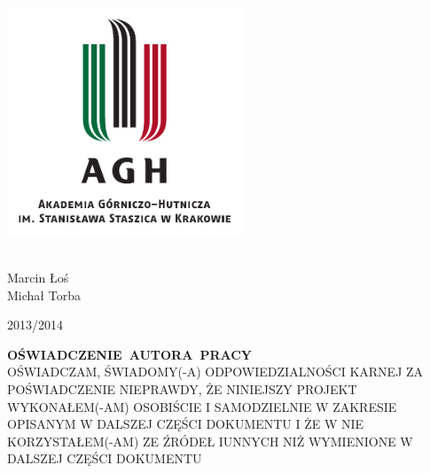 
\begin{titlepage}
  \begin{center} 

    \includegraphics[width=7cm]{images/agh_logo}
    \vspace{0.5cm}

    {\Huge \textbf{\Title}}
    \\
    \vspace{1cm}
    Marcin Łoś \\
    Michał Torba

    \vfill
    2013\slash 2014

  \end{center}
	\newpage
	\thispagestyle{empty}

	\mbox{}
	\vfill

	\begin{flushright}
	\begin{minipage}[!h]{13cm}
	\mbox{\large{\scshape \textbf{OŚWIADCZENIE AUTORA PRACY}}}\\[3mm] 
	{\scshape OŚWIADCZAM, ŚWIADOMY(-A) ODPOWIEDZIALNOŚCI KARNEJ ZA POŚWIADCZENIE NIEPRAWDY, ŻE NINIEJSZY PROJEKT WYKONAŁEM(-AM) OSOBIŚCIE I SAMODZIELNIE W ZAKRESIE OPISANYM W DALSZEJ CZĘŚCI DOKUMENTU I ŻE W NIE KORZYSTAŁEM(-AM) ZE ŹRÓDEŁ IUNNYCH NIŻ WYMIENIONE W DALSZEJ CZĘŚCI DOKUMENTU}\\
	\end{minipage}

	\vspace{2cm}

	\makebox[6cm][s]{\dotfill}\par

	\end{flushright}
\end{titlepage}
